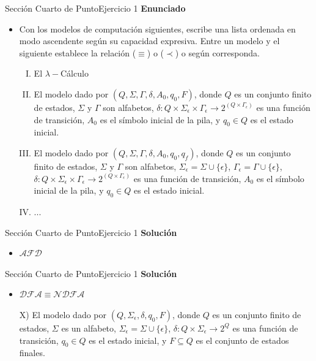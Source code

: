 \documentclass[10pt, envcountsect, presentation, aspectratio=169]{beamer}
\begin{document}
\begin{frame}{Sección Cuarto de Punto}{Ejercicio 1}
    \textbf{Enunciado}
    \begin{itemize}
        \item Con los modelos de computación  siguientes,  escribe una lista  ordenada en modo ascendente según su capacidad expresiva. Entre un modelo y el siguiente establece  la relación  ($\equiv$) o ($\prec$) o  según corresponda.
		\begin{enumerate}[I)]
            \item El $\lambda-$Cálculo
            \item El modelo dado por $(Q,\Sigma,\Gamma,\delta,A_0,q_0,F)$, donde  $Q$ es un conjunto finito de estados, $\Sigma$ y $\Gamma$ son alfabetos, $\delta:Q\times \Sigma_\epsilon\times\Gamma_\epsilon\rightarrow 2^{(Q\times\Gamma_\epsilon)}$ es  una función de transición, $A_0$ es el símbolo inicial de la pila, y $q_0\in Q$ es el estado inicial. 
            \item El modelo dado por $(Q,\Sigma,\Gamma,\delta,A_0,q_0,q_f)$, donde  $Q$ es un conjunto finito de estados, $\Sigma$ y $\Gamma$ son alfabetos, $\Sigma_\epsilon=\Sigma \cup \{\epsilon\}$, $\Gamma_\epsilon=\Gamma \cup \{\epsilon\}$, $\delta:Q\times \Sigma_\epsilon\times\Gamma_\epsilon\rightarrow 2^{(Q\times\Gamma_\epsilon)}$ es  una  función de transición, $A_0$ es el símbolo inicial de la pila, y $q_0\in Q$ es el estado inicial. 
            \item ...
        \end{enumerate}
	\end{itemize}
\end{frame}


\begin{frame}{Sección Cuarto de Punto}{Ejercicio 1}
    \textbf{Solución}\\
    \begin{itemize}
        \item $\mathcal{AFD}$
    \end{itemize}
\end{frame}


\begin{frame}{Sección Cuarto de Punto}{Ejercicio 1}
    \textbf{Solución}\\
    \begin{itemize}
        \item $\mathcal{DFA} \equiv \mathcal{NDFA}$
        \item[X)] El modelo dado por  $(Q,\Sigma_\epsilon,\delta,q_0,F)$, donde  $Q$ es un   conjunto finito de estados, $\Sigma$ es un alfabeto, $\Sigma_\epsilon=\Sigma \cup \{\epsilon\}$, $\delta:Q\times \Sigma_\epsilon\rightarrow 2^{Q}$ es una función de transición, $q_0\in Q$ es el  estado inicial, y $F\subseteq Q$ es el conjunto de estados finales.
    \end{itemize}
\end{frame}
\end{document}
